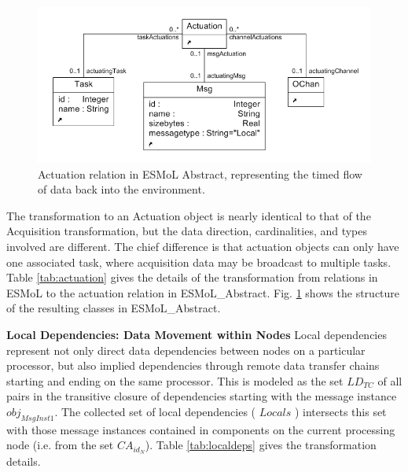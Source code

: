 \begin{figure}
\centering
\includegraphics[width=0.8\columnwidth]{figures/actuation.png}
    \caption{Actuation relation in ESMoL Abstract, representing the
timed flow of data back into the environment.}
    \label{fig:act_meta}
\end{figure}

The transformation to an Actuation object is nearly identical to that of the 
Acquisition transformation, but the data direction, cardinalities, and types 
involved are different.  The chief difference is that actuation objects can
only have one associated task, where acquisition data may be broadcast
to multiple tasks.  Table \ref{tab:actuation} gives the details of the
transformation from relations in ESMoL to the actuation relation in 
ESMoL\_Abstract.  Fig. \ref{fig:act_meta} shows the structure of the 
resulting classes in ESMoL\_Abstract.

\textbf{Local Dependencies: Data Movement within Nodes}
Local dependencies represent not only direct data dependencies between nodes on
a particular processor, but also implied dependencies through remote data
transfer chains starting and ending on the same processor.   This is modeled as
the set $LD_{TC}$ of all pairs in the transitive closure of dependencies
starting with the message instance $obj_{MsgInst1}$. The collected set of local
dependencies ( $Locals$ ) intersects this set with those message instances
contained in components on the current processing node (i.e. from the set $CA_{id_N}$).
Table \ref{tab:localdeps} gives the transformation details.


